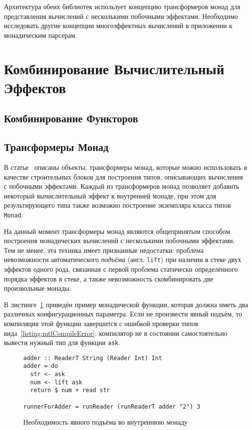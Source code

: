 Архитектура обеих библиотек использует концепцию трансформеров монад для представления вычислений с несколькими побочными эффектами. Необходимо исследовать другие концепции многоэффектных вычислений в приложении к монадическим парсерам. 

\section{Комбинирование Вычислительный Эффектов}

\subsection{Комбинирование Функторов}

\subsection{Трансформеры Монад}

В статье~\autocite{MonadTransformers} описаны объекты, трансформеры монад, которые можно использовать в качестве строительных блоков для построения типов, описывающих вычисления с побочными эффектами. Каждый из трансформеров монад позволяет добавить некоторый вычислительный эффект к внутренней монаде, при этом для результирующего типа также возможно построение экземпляра класса типов \lstinline{Monad}.

На данный момент трансформеры монад являются общепринятым способом построения монадических вычислений с несколькими побочными эффектами. Тем не менее, эта техника имеет признанные недостатки: проблема невозможности автоматического \emph{подъёма} (англ. \lstinline{lift}) при наличии в стеке двух эффектов одного рода, связанная с первой проблема статически определённого порядка эффектов в стеке, а также невозможность скомбинировать две произвольные монады. 

В листинге~\ref{listing:mtlReadersLift} приведён пример монадической функции, которая должна иметь два различных конфигурационных параметра. Если не произвести явный подъём, то компиляция этой функции завершится с ошибкой проверки типов вида~\ref{listing:mtlCompileError}: компилятор не в состоянии самостоятельно вывести нужный тип для функции \lstinline{ask}.

\begin{figure}[t]
\begin{lstlisting}
adder :: ReaderT String (Reader Int) Int
adder = do
  str <- ask
  num <- lift ask
  return $ num + read str

runnerForAdder = runReader (runReaderT adder "2") 3
\end{lstlisting}
\caption{Необходимость явного подъёма во внутреннюю монаду}
\label{listing:mtlReadersLift}
\end{figure}

